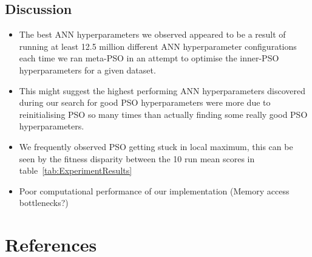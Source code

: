 \documentclass[11pt]{article}
\begin{document}
\subsection{Discussion}
\begin{itemize}
    \item The best ANN hyperparameters we observed appeared to be a result of running at least 12.5 million different ANN hyperparameter configurations each time we ran meta-PSO in an attempt to optimise the inner-PSO hyperparameters for a given dataset.
    \item This might suggest the highest performing ANN hyperparameters discovered during our search for good PSO hyperparameters  were more due to reinitialising PSO so many times than actually finding some really good PSO hyperparameters.
    \item We frequently observed PSO getting stuck in local maximum, this can be seen by the fitness disparity between the 10 run mean scores in table~\ref{tab:ExperimentResults}~
    \item Poor computational performance of our implementation (Memory access bottlenecks?)
\end{itemize}

\pagebreak
\appendix

\section{References}
\printbibliography
\end{document}
